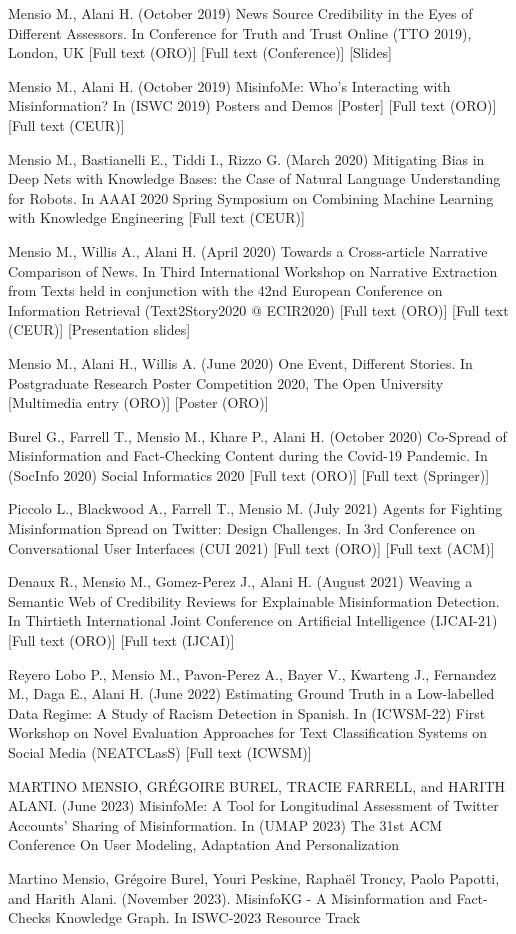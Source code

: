 Mensio M., Alani H. (October 2019) News Source Credibility in the Eyes of Different Assessors. In Conference for Truth and Trust Online (TTO 2019), London, UK [Full text (ORO)] [Full text (Conference)] [Slides]

Mensio M., Alani H. (October 2019) MisinfoMe: Who’s Interacting with Misinformation? In (ISWC 2019) Posters and Demos [Poster] [Full text (ORO)] [Full text (CEUR)]


Mensio M., Bastianelli E., Tiddi I., Rizzo G. (March 2020) Mitigating Bias in Deep Nets with Knowledge Bases: the Case of Natural Language Understanding for Robots. In AAAI 2020 Spring Symposium on Combining Machine Learning with Knowledge Engineering [Full text (CEUR)]

Mensio M., Willis A., Alani H. (April 2020) Towards a Cross-article Narrative Comparison of News. In Third International Workshop on Narrative Extraction from Texts held in conjunction with the 42nd European Conference on Information Retrieval (Text2Story2020 @ ECIR2020) [Full text (ORO)] [Full text (CEUR)] [Presentation slides]

Mensio M., Alani H., Willis A. (June 2020) One Event, Different Stories. In Postgraduate Research Poster Competition 2020, The Open University [Multimedia entry (ORO)] [Poster (ORO)]

Burel G., Farrell T., Mensio M., Khare P., Alani H. (October 2020) Co-Spread of Misinformation and Fact-Checking Content during the Covid-19 Pandemic. In (SocInfo 2020) Social Informatics 2020 [Full text (ORO)] [Full text (Springer)]

Piccolo L., Blackwood A., Farrell T., Mensio M. (July 2021) Agents for Fighting Misinformation Spread on Twitter: Design Challenges. In 3rd Conference on Conversational User Interfaces (CUI 2021) [Full text (ORO)] [Full text (ACM)]

Denaux R., Mensio M., Gomez-Perez J., Alani H. (August 2021) Weaving a Semantic Web of Credibility Reviews for Explainable Misinformation Detection. In Thirtieth International Joint Conference on Artificial Intelligence (IJCAI-21) [Full text (ORO)] [Full text (IJCAI)]

Reyero Lobo P., Mensio M., Pavon-Perez A., Bayer V., Kwarteng J., Fernandez M., Daga E., Alani H. (June 2022) Estimating Ground Truth in a Low-labelled Data Regime: A Study of Racism Detection in Spanish. In (ICWSM-22) First Workshop on Novel Evaluation Approaches for Text Classification Systems on Social Media (NEATCLasS) [Full text (ICWSM)]


MARTINO MENSIO, GRÉGOIRE BUREL, TRACIE FARRELL, and HARITH ALANI. (June 2023) MisinfoMe: A Tool for Longitudinal Assessment of Twitter Accounts’ Sharing of Misinformation. In (UMAP 2023) The 31st ACM Conference On User Modeling, Adaptation And Personalization

Martino Mensio, Grégoire Burel, Youri Peskine, Raphaël Troncy, Paolo Papotti, and Harith Alani. (November 2023).
MisinfoKG - A Misinformation and Fact-Checks
Knowledge Graph. In ISWC-2023 Resource Track
